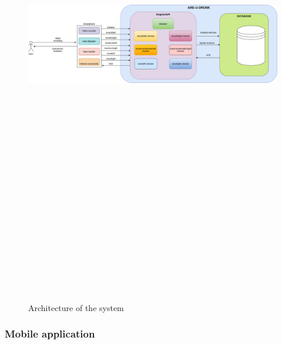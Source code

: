 \begin{figure}[H]
    \centering
    \includegraphics[angle=90, height=23cm,keepaspectratio]{./img/Architecture.png}
    \caption{Architecture of the system}
    \label{architecture}
\end{figure}



\subsubsection{Mobile application}

